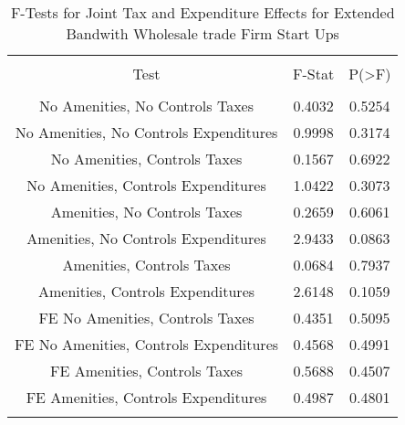 
\begin{table}[!htbp] \centering 
  \caption{F-Tests for Joint Tax and Expenditure Effects for Extended Bandwith Wholesale trade Firm Start Ups} 
  \label{42Ftests} 
\begin{tabular}{@{\extracolsep{5pt}} ccc} 
\\[-1.8ex]\hline 
\hline \\[-1.8ex] 
Test & F-Stat & P(\textgreater F) \\ 
\hline \\[-1.8ex] 
No Amenities, No Controls Taxes & 0.4032 & 0.5254 \\ 
No Amenities, No Controls Expenditures & 0.9998 & 0.3174 \\ 
No Amenities, Controls Taxes & 0.1567 & 0.6922 \\ 
No Amenities, Controls Expenditures & 1.0422 & 0.3073 \\ 
Amenities, No Controls Taxes & 0.2659 & 0.6061 \\ 
Amenities, No Controls Expenditures & 2.9433 & 0.0863 \\ 
Amenities, Controls Taxes & 0.0684 & 0.7937 \\ 
Amenities, Controls Expenditures & 2.6148 & 0.1059 \\ 
FE No Amenities, Controls Taxes & 0.4351 & 0.5095 \\ 
FE No Amenities, Controls Expenditures & 0.4568 & 0.4991 \\ 
FE Amenities, Controls Taxes & 0.5688 & 0.4507 \\ 
FE Amenities, Controls Expenditures & 0.4987 & 0.4801 \\ 
\hline \\[-1.8ex] 
\end{tabular} 
\end{table} 
